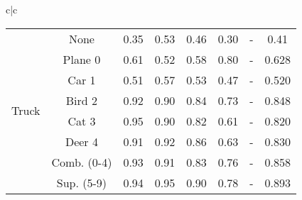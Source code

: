 \documentclass[acmtog, nonacm]{acmart}
\begin{document}
\begin{tabular}{c|c}
\begin{tabular}{@{}c|c|ccccc|c@{}}
\midrule
\multirow{8}{*}{Truck} & None                      & 0.35 & 0.53 & 0.46  & 0.30 & -     & 0.41                 \\
                       & Plane 0                   & 0.61 & 0.52 & 0.58  & 0.80 & -     & 0.628                \\
                       & Car 1                     & 0.51 & 0.57 & 0.53  & 0.47 & -     & 0.520                \\
                       & Bird 2                    & 0.92 & 0.90 & 0.84  & 0.73 & -     & 0.848                \\
                       & Cat 3                     & 0.95 & 0.90 & 0.82  & 0.61 & -     & 0.820                \\
                       & Deer 4                    & 0.91 & 0.92 & 0.86  & 0.63 & -     & 0.830                \\
                       & Comb. (0-4)               & 0.93 & 0.91 & 0.83  & 0.76 & -     & 0.858                \\
                       & Sup. (5-9)                & 0.94 & 0.95 & 0.90  & 0.78 & -     & 0.893\\
\midrule
\end{tabular}
\end{tabular}
\end{document}
